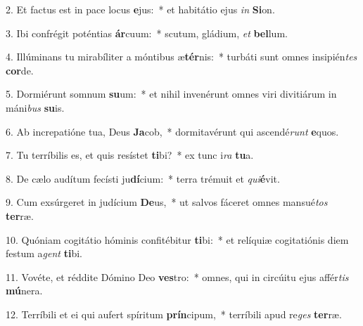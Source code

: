 2. Et factus est in pace locus \textbf{e}jus:~*  et habitátio ejus \textit{in} \textbf{Si}on.\

3. Ibi confrégit poténtias \textbf{ár}cuum:~*  scutum, gládium, \textit{et} \textbf{bel}lum.\

4. Illúminans tu mirabíliter a móntibus æ\textbf{tér}nis:~*  turbáti sunt omnes insipién\textit{tes} \textbf{cor}de.\

5. Dormiérunt somnum \textbf{su}um:~*  et nihil invenérunt omnes viri divitiárum in máni\textit{bus} \textbf{su}is.\

6. Ab increpatióne tua, Deus \textbf{Ja}cob,~*  dormitavérunt qui ascendé\textit{runt} \textbf{e}quos.\

7. Tu terríbilis es, et quis resístet \textbf{ti}bi?~*  ex tunc i\textit{ra} \textbf{tu}a.\

8. De cælo audítum fecísti ju\textbf{dí}cium:~*  terra trémuit et \textit{qui}\textbf{é}vit.\

9. Cum exsúrgeret in judícium \textbf{De}us,~*  ut salvos fáceret omnes mansué\textit{tos} \textbf{ter}ræ.\

10. Quóniam cogitátio hóminis confitébitur \textbf{ti}bi:~*  et relíquiæ cogitatiónis diem festum a\textit{gent} \textbf{ti}bi.\

11. Vovéte, et réddite Dómino Deo \textbf{ves}tro:~*  omnes, qui in circúitu ejus affér\textit{tis} \textbf{mú}nera.\

12. Terríbili et ei qui aufert spíritum \textbf{prín}cipum,~*  terríbili apud re\textit{ges} \textbf{ter}ræ.\

